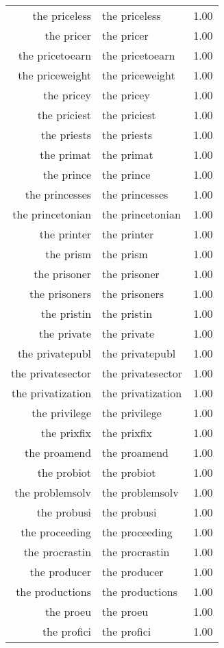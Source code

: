 \begin{table}[ht]
\begin{tabular}{rlr}
  the priceless & the priceless & 1.00 \\ 
  the pricer & the pricer & 1.00 \\ 
  the pricetoearn & the pricetoearn & 1.00 \\ 
  the priceweight & the priceweight & 1.00 \\ 
  the pricey & the pricey & 1.00 \\ 
  the priciest & the priciest & 1.00 \\ 
  the priests & the priests & 1.00 \\ 
  the primat & the primat & 1.00 \\ 
  the prince & the prince & 1.00 \\ 
  the princesses & the princesses & 1.00 \\ 
  the princetonian & the princetonian & 1.00 \\ 
  the printer & the printer & 1.00 \\ 
  the prism & the prism & 1.00 \\ 
  the prisoner & the prisoner & 1.00 \\ 
  the prisoners & the prisoners & 1.00 \\ 
  the pristin & the pristin & 1.00 \\ 
  the private & the private & 1.00 \\ 
  the privatepubl & the privatepubl & 1.00 \\ 
  the privatesector & the privatesector & 1.00 \\ 
  the privatization & the privatization & 1.00 \\ 
  the privilege & the privilege & 1.00 \\ 
  the prixfix & the prixfix & 1.00 \\ 
  the proamend & the proamend & 1.00 \\ 
  the probiot & the probiot & 1.00 \\ 
  the problemsolv & the problemsolv & 1.00 \\ 
  the probusi & the probusi & 1.00 \\ 
  the proceeding & the proceeding & 1.00 \\ 
  the procrastin & the procrastin & 1.00 \\ 
  the producer & the producer & 1.00 \\ 
  the productions & the productions & 1.00 \\ 
  the proeu & the proeu & 1.00 \\ 
  the profici & the profici & 1.00 \\ 

\end{tabular}
\end{table}
